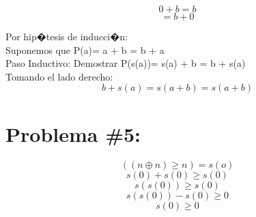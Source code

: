 \documentclass[12pt,letterpaper]{article}
\begin{document}
\[
		0 + b = b 
\]
\[
		 = b + 0 
\]

Por hip�tesis de inducci�n:\\
Suponemos que P(a)= a + b = b + a\\
Paso Inductivo: Demostrar P(s(a))= s(a) + b = b + s(a)\\
Tomando el lado derecho:
\[
	 b + s(a) = s (a + b)
	 = s (a + b) 
\]

\section*{Problema \#5: }
\[
	((n\oplus n)\geq n) = s(o)
\]
\[
	s(0) + s(0)\geq s(0) 
\]
\[
	s(s(0))\geq s(0) 
\]
\[
	s(s(0))-s(0)\geq  0
\]
\[
	s(0)\geq  0
\]
\end{document}
